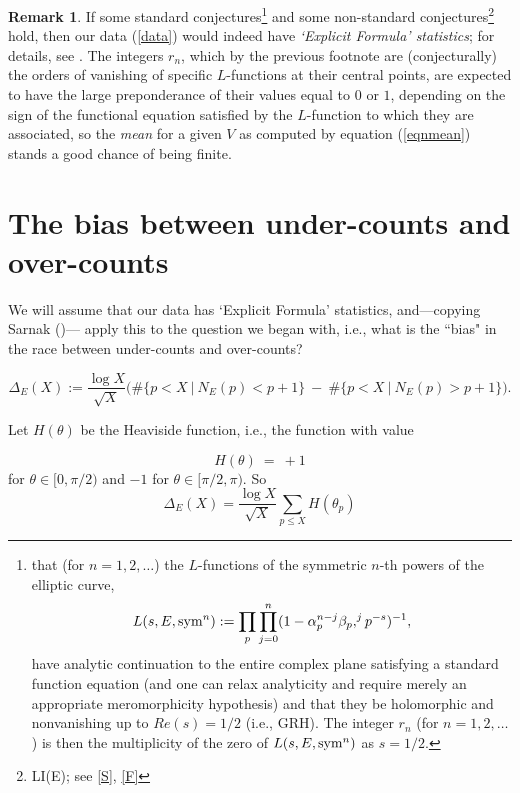 \documentclass[11pt]{article}
\theoremstyle{plain}
\theoremstyle{definition}
\newtheorem{remark}[theorem]{Remark}
\numberwithin{equation}{section}
\numberwithin{figure}{section}
\numberwithin{table}{section}
\begin{document}
\begin{remark}  If some standard conjectures{\footnote{that (for $n=1,2,\dots$) the $L$-functions of the symmetric $n$-th powers of the elliptic curve, \begin{equation}
L(s, E, {\rm sym}^n): = \prod_p\prod_{j=0}^n(1- \alpha_p^{n-j}\beta_p,^jp^{-s})^{-1},
\end{equation} have analytic continuation   to the entire complex plane satisfying a standard function equation (and one can relax analyticity and require merely an appropriate meromorphicity hypothesis) and that they be holomorphic and nonvanishing up to $Re(s) =1/2$ (i.e., GRH).  The integer $r_n$ (for $n=1,2,\dots$)  is then the multiplicity of the zero of $L(s, E, {\rm sym}^n)$ as $s=1/2$. \vskip20pt }} and some non-standard conjectures{\footnote{LI(E); see  \ref{S}, \ref{F}}}  hold, then our data (\ref{data}) would indeed have {\it `Explicit Formula' statistics}; for details, see \cite{S}.  The integers $r_n$, which by the previous footnote are (conjecturally) the orders of vanishing of specific $L$-functions at their central points, are expected to have the large preponderance of their values equal to  $0$ or $1$, depending on the sign of the functional equation satisfied by the $L$-function to which they are associated,  so the {\it mean} for  a given $V$ as computed by equation (\ref{eqnmean}) stands a good chance of being finite.
\end{remark}


\section{The bias between under-counts and over-counts}
  We will assume that our data has `Explicit Formula' statistics, and---copying Sarnak ({\cite{S}})--- apply this to the question we began with, i.e., what is the ``bias" in the race between under-counts and over-counts?

$$\Delta_E(X):={\frac{\log X}{\sqrt X}}\big(\#\{ p < X\ | \ N_E(p) < p+1\}\ - \ \#\{ p < X\ | \ N_E(p) > p+1\}\big).$$


Let $H(\theta)$ be the Heaviside function, i.e., the function with value

\begin{equation}
H(\theta) \ = \ +1
\end{equation}
 for $\theta \in [0, \pi/2)$ and  $-1$ for $\theta \in [\pi/2, \pi)$.  So
\begin{equation}
\Delta_E(X) = {\frac{\log X}{\sqrt X}}\sum_{p\le X} H(\theta_p)
\end{equation}
\end{document}
